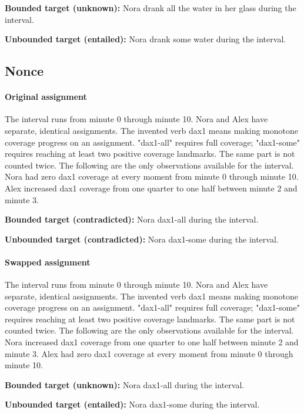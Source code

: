 \documentclass[acmlarge,anonymous,review,nonacm]{acmart}
\begin{document}
\noindent\textbf{Bounded target (unknown):} Nora drank all the water in her glass during the interval.\par
\noindent\textbf{Unbounded target (entailed):} Nora drank some water during the interval.\par

\subsection{Nonce}
\paragraph{Original assignment} The interval runs from minute 0 through minute 10. Nora and Alex have separate, identical assignments. The invented verb dax1 means making monotone coverage progress on an assignment. "dax1-all" requires full coverage; "dax1-some" requires reaching at least two positive coverage landmarks. The same part is not counted twice. The following are the only observations available for the interval. Nora had zero dax1 coverage at every moment from minute 0 through minute 10. Alex increased dax1 coverage from one quarter to one half between minute 2 and minute 3.

\noindent\textbf{Bounded target (contradicted):} Nora dax1-all during the interval.\par
\noindent\textbf{Unbounded target (contradicted):} Nora dax1-some during the interval.\par

\paragraph{Swapped assignment} The interval runs from minute 0 through minute 10. Nora and Alex have separate, identical assignments. The invented verb dax1 means making monotone coverage progress on an assignment. "dax1-all" requires full coverage; "dax1-some" requires reaching at least two positive coverage landmarks. The same part is not counted twice. The following are the only observations available for the interval. Nora increased dax1 coverage from one quarter to one half between minute 2 and minute 3. Alex had zero dax1 coverage at every moment from minute 0 through minute 10.

\noindent\textbf{Bounded target (unknown):} Nora dax1-all during the interval.\par
\noindent\textbf{Unbounded target (entailed):} Nora dax1-some during the interval.\par
\end{document}
